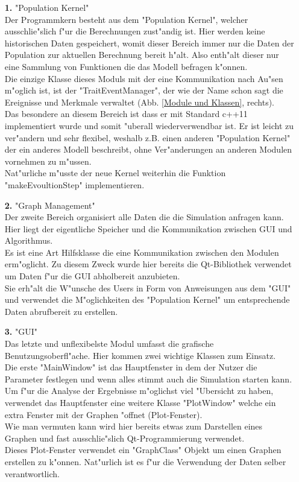 \documentclass[11pt, a4paper, german]{article}
\theoremstyle{plain}
\begin{document}
	\begin{itemize}
		\item [\textbf{1.}] "{}Population Kernel"{}\\
		Der Programmkern besteht aus dem "{}Population Kernel"{}, welcher ausschlie"slich f"ur die Berechnungen zust"andig ist. Hier werden keine historischen Daten gespeichert, womit dieser Bereich immer nur die Daten der Population zur aktuellen Berechnung bereit h"alt. Also enth"alt dieser nur eine Sammlung von Funktionen die das Modell befragen k"onnen.\\
		Die einzige Klasse dieses Moduls mit der eine Kommunikation nach Au"sen m"oglich ist, ist der "{}TraitEventManager"{}, der wie der Name schon sagt die Ereignisse und Merkmale verwaltet (Abb. \ref{Module und Klassen}, rechts).\\
		Das besondere an diesem Bereich ist dass er mit Standard c++11 implementiert wurde und somit "uberall wiederverwendbar ist. Er ist leicht zu ver"andern und sehr flexibel, weshalb z.B. einen anderen "{}Population Kernel"{} der ein anderes Modell beschreibt, ohne Ver"anderungen an anderen Modulen vornehmen zu m"ussen. \\
		Nat"urliche m"usste der neue Kernel weiterhin die Funktion "{}makeEvoultionStep"{} implementieren.
		\item [\textbf{2.}] "{}Graph Management"{}\\
		Der zweite Bereich organisiert alle Daten die die Simulation anfragen kann. Hier liegt der eigentliche Speicher und die Kommunikation zwischen GUI und Algorithmus.\\
		Es ist eine Art Hilfsklasse die eine Kommunikation zwischen den Modulen erm"oglicht. Zu diesem Zweck wurde hier bereits die Qt-Bibliothek verwendet um Daten f"ur die GUI abholbereit anzubieten.\\
		Sie erh"alt die W"unsche des Users in Form von Anweisungen aus dem "{}GUI"{} und verwendet die M"oglichkeiten des "{}Population Kernel"{} um entsprechende Daten abrufbereit zu erstellen.
		\item [\textbf{3.}] "{}GUI"{}\\
		Das letzte und unflexibelste Modul umfasst die grafische Benutzungsoberfl"ache. Hier kommen zwei wichtige Klassen zum Einsatz.\\
		Die erste "{}MainWindow"{} ist das Hauptfenster in dem der Nutzer die Parameter festlegen und wenn alles stimmt auch die Simulation starten kann. Um f"ur die Analyse der Ergebnisse m"oglichst viel "Ubersicht zu haben, verwendet das Hauptfenster eine weitere Klasse "{}PlotWindow"{} welche ein extra Fenster mit der Graphen "offnet (Plot-Fenster).\\
		Wie man vermuten kann wird hier bereits etwas zum Darstellen eines Graphen und fast ausschlie"slich Qt-Programmierung verwendet.\\
		Dieses Plot-Fenster verwendet ein "{}GraphClass"{} Objekt um einen Graphen erstellen zu k"onnen. Nat"urlich ist es f"ur die Verwendung der Daten selber verantwortlich.
	\end{itemize}	
 	
\end{document}

